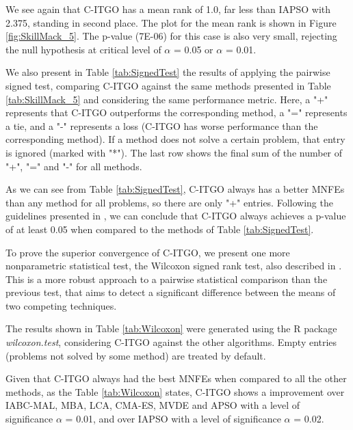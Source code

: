 We see again that C-ITGO has a mean rank of 1.0, far less than IAPSO with 2.375, standing in second place. The plot for the mean rank is shown in Figure \ref{fig:SkillMack_5}. The p-value (7E-06) for this case is also very small, rejecting the null hypothesis at critical level of $\alpha$ = 0.05 or $\alpha$ = 0.01.


We also present in Table \ref{tab:SignedTest} the results of applying the pairwise signed test, comparing C-ITGO against the same methods presented in Table \ref{tab:SkillMack_5} and considering the same performance metric. Here, a "+" represents that C-ITGO outperforms the corresponding method, a "=" represents a tie, and a "-" represents a loss (C-ITGO has worse performance than the corresponding method). If a method does not solve a certain problem, that entry is ignored (marked with "*"). The last row shows the final sum of the number of "+", "=" and "-" for all methods.



As we can see from Table \ref{tab:SignedTest}, C-ITGO always has a better MNFEs than any method for all problems, so there are only "+" entries. Following the guidelines presented in \cite{Friedman}, we can conclude that C-ITGO always achieves a p-value of at least 0.05 when compared to the methods of Table \ref{tab:SignedTest}.


To prove the superior convergence of C-ITGO, we present one more nonparametric statistical test, the Wilcoxon signed rank test, also described in \cite{Friedman}. This is a more robust approach to a pairwise statistical comparison than the previous test, that aims to detect a significant difference between the means of two competing techniques. 

The results shown in Table \ref{tab:Wilcoxon} were generated using the R package \textit{wilcoxon.test}, considering C-ITGO against the other algorithms. Empty entries (problems not solved by some method) are treated by default.




Given that C-ITGO always had the best MNFEs when compared to all the other methods, as the Table \ref{tab:Wilcoxon} states, C-ITGO shows a improvement over IABC-MAL, MBA, LCA, CMA-ES, MVDE and APSO  with a level of significance $\alpha$ = 0.01, and over IAPSO with a level of significance $\alpha$ = 0.02.